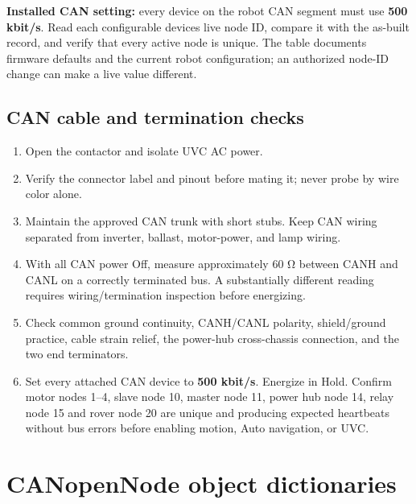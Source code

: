 \documentclass[
  10pt,
  letterpaper,
  openany]{report}
\providecommand{\tightlist}{%
  \setlength{\itemsep}{0pt}\setlength{\parskip}{0pt}}
\begin{document}
\begin{manualnotice}

\textbf{Installed CAN setting:} every device on the robot CAN segment
must use \textbf{500 kbit/s}. Read each configurable
device\textquotesingle s live node ID, compare it with the as-built
record, and verify that every active node is unique. The table documents
firmware defaults and the current robot configuration; an authorized
node-ID change can make a live value different.

\end{manualnotice}

\subsection{CAN cable and termination
checks}\label{can-cable-and-termination-checks}

\begin{enumerate}
\tightlist
\item
  Open the contactor and isolate UVC AC power.
\item
  Verify the connector label and pinout before mating it; never probe by
  wire color alone.
\item
  Maintain the approved CAN trunk with short stubs. Keep CAN wiring
  separated from inverter, ballast, motor-power, and lamp wiring.
\item
  With all CAN power Off, measure approximately 60 Ω between CANH and
  CANL on a correctly terminated bus. A substantially different reading
  requires wiring/termination inspection before energizing.
\item
  Check common ground continuity, CANH/CANL polarity, shield/ground
  practice, cable strain relief, the power-hub cross-chassis connection,
  and the two end terminators.
\item
  Set every attached CAN device to \textbf{500 kbit/s}. Energize in
  Hold. Confirm motor nodes 1--4, slave node 10, master node 11, power
  hub node 14, relay node 15 and rover node 20 are unique and producing
  expected heartbeats without bus errors before enabling motion, Auto
  navigation, or UVC.
\end{enumerate}

\protect{}\label{canopen-objects}
\section{CANopenNode object
dictionaries}\label{canopennode-object-dictionaries}
\end{document}

